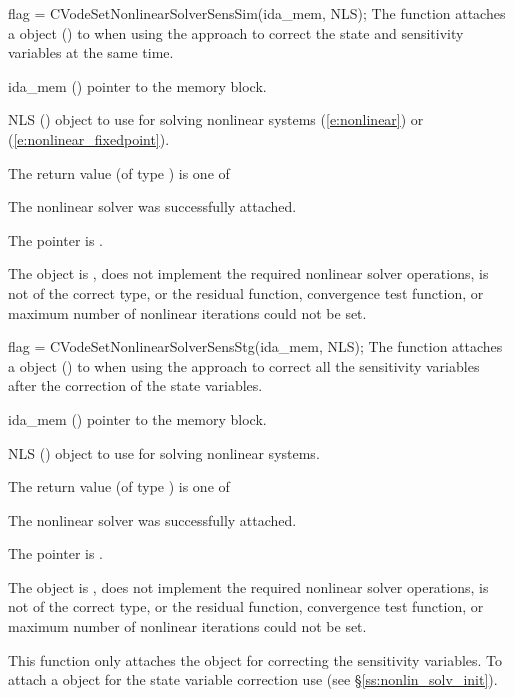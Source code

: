 {
  flag = CVodeSetNonlinearSolverSensSim(ida\_mem, NLS);
}
{
  The function  attaches a {\sunnonlinsol}
  object () to {\cvodes} when using the  approach to
  correct the state and sensitivity variables at the same time.
}
{
  \begin{args}
  \item[ida\_mem] ()
    pointer to the {\cvodes} memory block.
  \item[NLS] ()
    {\sunnonlinsol} object to use for solving nonlinear systems
    (\ref{e:nonlinear}) or (\ref{e:nonlinear_fixedpoint}).
  \end{args}
}
{
  The return value  (of type ) is one of
  \begin{args}
  \item[\Id{CV\_SUCCESS}]
    The nonlinear solver was successfully attached.
  \item[\Id{CV\_MEM\_NULL}]
    The  pointer is .
  \item[\Id{CV\_ILL\_INPUT}]
    The {\sunnonlinsol} object is , does not implement the required
    nonlinear solver operations, is not of the correct type, or the residual
    function, convergence test function, or maximum number of nonlinear
    iterations could not be set.
  \end{args}
}
{}


{
  flag = CVodeSetNonlinearSolverSensStg(ida\_mem, NLS);
}
{
  The function  attaches a {\sunnonlinsol}
  object () to {\cvodes} when using the  approach to
  correct all the sensitivity variables after the correction of the state
  variables.
}
{
  \begin{args}
  \item[ida\_mem] ()
    pointer to the {\cvodes} memory block.
  \item[NLS] ()
    {\sunnonlinsol} object to use for solving nonlinear systems.
  \end{args}
}
{
  The return value  (of type ) is one of
  \begin{args}
  \item[\Id{CV\_SUCCESS}]
    The nonlinear solver was successfully attached.
  \item[\Id{CV\_MEM\_NULL}]
    The  pointer is .
  \item[\Id{CV\_ILL\_INPUT}]
    The {\sunnonlinsol} object is , does not implement the required
    nonlinear solver operations, is not of the correct type, or the residual
    function, convergence test function, or maximum number of nonlinear
    iterations could not be set.
  \end{args}
}
{
  This function only attaches the {\sunnonlinsol} object for correcting the
  sensitivity variables. To attach a {\sunnonlinsol} object for the state
  variable correction use  (see
  \S\ref{ss:nonlin_solv_init}).
}


